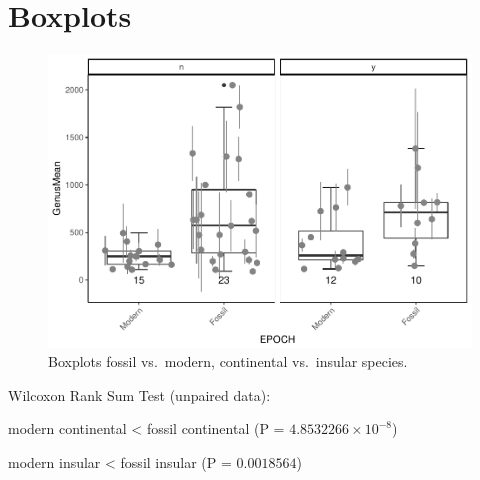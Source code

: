 \section{Boxplots}


\begin{figure}[htbp]
	\centering
	\includegraphics{MA_JJ_files/figure-latex/BPFMCI-1.pdf}
	\caption{Boxplots fossil vs.~modern, continental vs.~insular species.}
	\label{BoxFoMCI}
\end{figure}


Wilcoxon Rank Sum Test (unpaired data):

modern continental \textless{} fossil continental (P =
\(4.8532266\times 10^{-8}\))

modern insular \textless{} fossil insular (P = \(0.0018564\))








